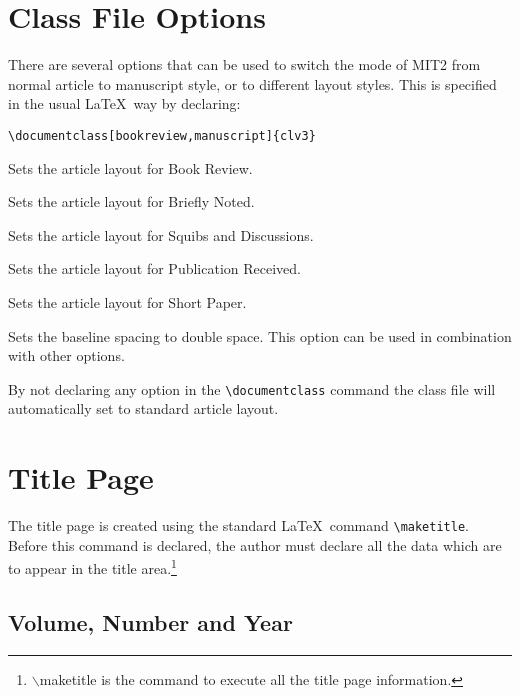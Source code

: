 \documentclass{clv3}
\begin{document}
\section{Class File Options}

There are several options that can be used to switch the mode of MIT2 from normal 
article to manuscript style, or to different layout styles. This is specified in 
the usual \LaTeX\ way by declaring:

\verb|\documentclass[bookreview,manuscript]{clv3}|


\begin{deflist}
\item[bookreview] Sets the article layout for Book Review.
\item[brief] Sets the article layout for Briefly Noted.
\item[discussion] Sets the article layout for Squibs and Discussions.
\item[pubrec] Sets the article layout for Publication Received.
\item[shortpaper] Sets the article layout for Short Paper.
\item[manuscript] Sets the baseline spacing to double space. This 
option can be used in combination with other options.
\end{deflist}

By not declaring any option in the \verb|\documentclass| command the class file
will automatically set to standard article layout.

\section{Title Page}

The title page is created using the standard \LaTeX\ command \verb|\maketitle|. 
Before this command is declared, the author must declare all the data which are 
to appear in the title area.\footnote{$\backslash$maketitle is the command to execute all the title page information.}

\subsection{Volume, Number and Year}
\end{document}
